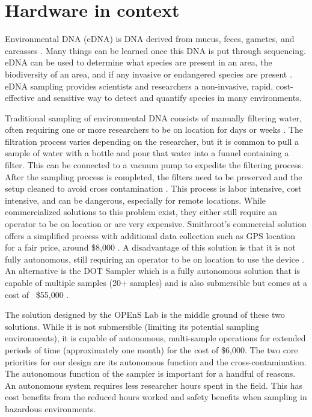\documentclass[11pt, letterpaper]{article}
\begin{document}

\newpage
\section{Hardware in context}

Environmental DNA (eDNA) is DNA derived from mucus, feces, gametes, and carcasses \cite{web:USGS:eDNA}. Many things can be learned once this DNA is put through sequencing. eDNA can be used to determine what species are present in an area, the biodiversity of an area, and if any invasive or endangered species are present \cite{web:NOAA:eDNA}. eDNA sampling provides scientists and researchers a non-invasive, rapid, cost-effective and sensitive way to detect and quantify species in many environments.  
\newline\par
Traditional sampling of environmental DNA consists of manually filtering water, often requiring one or more researchers to be on location for days or weeks \cite{art:Taal}. The filtration process varies depending on the researcher, but it is common to pull a sample of water with a bottle and pour that water into a funnel containing a filter. This can be connected to a vacuum pump to expedite the filtering process. After the sampling process is completed, the filters need to be preserved and the setup cleaned to avoid cross contamination \cite{art:Taal}. This process is labor intensive, cost intensive, and can be dangerous, especially for remote locations. While commercialized solutions to this problem exist, they either still require an operator to be on location or are very expensive. Smithroot’s commercial solution offers a simplified process with additional data collection such as GPS location for a fair price, around \$8,000 \cite{web:smithroot}. A disadvantage of this solution is that it is not fully autonomous, still requiring an operator to be on location to use the device \cite{web:smithroot}. An alternative is the DOT Sampler which is a fully autonomous solution that is capable of multiple samples (20+ samples) and is also submersible but comes at a cost of ~\$55,000 \cite{art:DOT}. 
\newline\par
The solution designed by the OPEnS Lab is the middle ground of these two solutions. While it is not submersible (limiting its potential sampling environments), it is capable of autonomous, multi-sample operations for extended periods of time (approximately one month) for the cost of \$6,000. The two core priorities for our design are its autonomous function and the cross-contamination. The autonomous function of the  sampler is important for a handful of reasons. An autonomous system requires less researcher hours spent in the field. This has cost benefits from the reduced hours worked and safety benefits when sampling in hazardous environments.     
\end{document}
